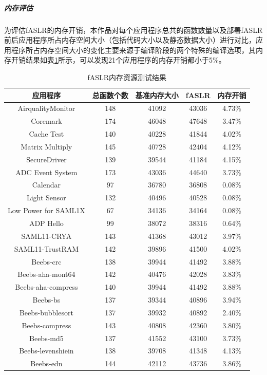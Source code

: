 \documentclass[UTF8,12pt,a4paper]{ctexart}
\numberwithin{figure}{section}
\begin{document}
\subparagraph{内存评估}
\par 为评估fASLR的内存开销，本作品对每个应用程序总共的函数数量以及部署fASLR前后应用程序所占内存空间大小（包括代码大小以及静态数据大小）进行对比，应用程序所占内存空间大小的变化主要来源于编译阶段的两个特殊的编译选项，其内存开销结果如表\ref{table2}所示，可以发现21个应用程序的内存开销都小于5\%。
\begin{longtable}{ccccc}
    \caption{fASLR内存资源测试结果}
    \label{table2}                                         \\
    \hline
    应用程序                 & 总函数个数 & 基准内存大小 & fASLR & 内存开销   \\ \hline
    AirqualityMonitor    & 148   & 41092  & 43036 & 4.73\% \\ 
    Coremark             & 174   & 46048  & 47648 & 3.47\% \\ 
    Cache Test           & 140   & 40228  & 41844 & 4.02\% \\ 
    Matrix Multiply      & 145   & 40728  & 42404 & 4.12\% \\ 
    SecureDriver         & 139   & 39544  & 41184 & 4.15\% \\ 
    ADC Event System     & 173   & 43036  & 44640 & 3.73\% \\ 
    Calendar             & 97    & 36780  & 36808 & 0.08\% \\ 
    Light Sensor         & 132   & 40496  & 40528 & 0.08\% \\ 
    Low Power for SAML1X & 67    & 34136  & 34164 & 0.08\% \\ 
    ADP Hello            & 99    & 38072  & 38316 & 0.64\% \\ 
    SAML11-CRYA          & 143   & 41368  & 43012 & 3.97\% \\ 
    SAML11-TrustRAM      & 142   & 39896  & 41500 & 4.02\% \\ 
    Beebs-crc            & 138   & 39944  & 41492 & 3.88\% \\ 
    Beebs-aha-mont64     & 142   & 40476  & 42028 & 3.83\% \\ 
    Beebs-aha-compress   & 140   & 39944  & 41492 & 3.88\% \\ 
    Beebs-bs             & 137   & 39344  & 40896 & 3.94\% \\ 
    Beebs-bubblesort     & 137   & 39932  & 40892 & 2.40\% \\ 
    Beebs-compress       & 143   & 40808  & 42360 & 3.80\% \\ 
    Beebs-md5            & 137   & 41552  & 43100 & 3.73\% \\ 
    Beebs-levenshiein    & 138   & 39708  & 41348 & 4.13\% \\ 
    Beebs-edn            & 144   & 42112  & 43736 & 3.86\% \\ \hline
\end{longtable}
\end{document}
